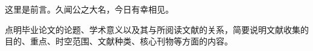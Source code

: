 \begin{foreword}
    这里是前言。久闻公之大名，今日有幸相见。

    点明毕业论文的论题、学术意义以及其与所阅读文献的关系，简要说明文献收集的目的、重点、时空范围、文献种类、核心刊物等方面的内容。
\end{foreword}

